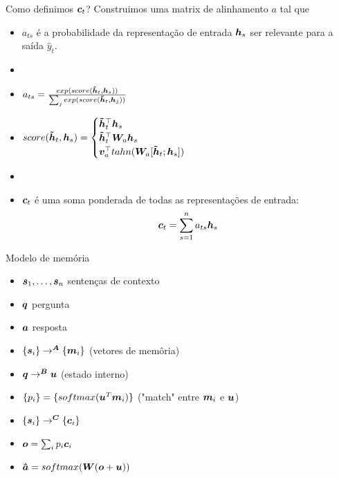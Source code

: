 \documentclass[10pt]{beamer}
\begin{document}
\begin{frame}{Como definimos $\bm{c}_t$?}
Construimos uma matrix de alinhamento $a$ tal que

\begin{itemize}
\item $a_{ts}$ é a probabilidade da representação de entrada $\bm{h}_s$ ser relevante para a saída $\hat{y}_t$.
\item[]
\item $a_{ts} = \frac{exp(score(\bm{\tilde{h}}_t,\bm{h}_s))}{\sum_j exp(score(\bm{\tilde{h}}_t,\bm{h}_j))}$ 

\item $score(\bm{\tilde{h}}_t,\bm{h}_s) = \begin{cases}
\bm{\tilde{h}}_t ^{\top}\bm{h}_s\\
\bm{\tilde{h}}_t ^{\top}\bm{W}_a \bm{h}_s\\
\bm{v}_a ^{\top}tahn(\bm{W}_a[\bm{\tilde{h}}_t;\bm{h}_s])\\
\end{cases}$ 
\item[]
\item $\bm{c}_t$ é uma soma ponderada de todas as representações de entrada: 
\begin{equation*}
\bm{c}_t = \sum_{s=1}^{n} a_{ts}\bm{h}_s
\end{equation*}
\end{itemize}
\end{frame}



\begin{frame}{Modelo de memória}
\begin{itemize}
\item $\bm{s}_1, \dots, \bm{s}_n$ sentenças de contexto
\item $\bm{q}$ pergunta
\item $\bm{a}$ resposta
\item $\{ \bm{s}_i\} \rightarrow^{\bm{A}} \{ \bm{m}_i\}$  (vetores de memôria)
\item $\bm{q} \rightarrow^{\bm{B}} \bm{u}$  (estado interno)
\item $\{ p_i\} = \{ softmax(\bm{u}^{T}\bm{m}_i)\}$  ("match" entre $\bm{m}_i$ e $\bm{u}$)
\item $\{ \bm{s}_i\} \rightarrow^{\bm{C}} \{ \bm{c}_i\}$
\item $\bm{o}= \sum_{i} p_i \bm{c}_i$
\item $\bm{\hat{a}}= softmax(\bm{W}(\bm{o} + \bm{u}))$
\end{itemize}
\end{frame}
\end{document}
